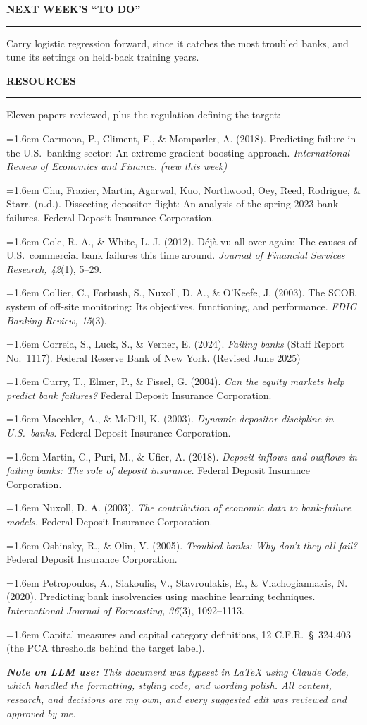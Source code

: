 \documentclass[11pt,letterpaper]{article}
\newcommand{\sectionhead}[1]{%
  \vspace{6pt}%
  {\sffamily\bfseries\fontsize{9.5}{12}\selectfont\color{navy}\MakeUppercase{#1}}\par
  \vspace{-9pt}\textcolor{hairline}{\rule{\textwidth}{0.5pt}}\par\vspace{0pt}}
\newcommand{\answer}[1]{#1\par\vspace{3pt}}
\begin{document}
\sectionhead{Next week's ``To Do''}
\answer{Carry logistic regression forward, since it catches the most troubled banks, and tune its settings on held-back training years.}

\sectionhead{Resources}
\answer{Eleven papers reviewed, plus the regulation defining the target:
{\fontsize{9}{11.5}\selectfont\setlength{\parskip}{3pt}\par\vspace{4pt}
\newcommand{\refentry}[1]{\hangindent=1.6em\hangafter=1 #1\par}
\refentry{Carmona, P., Climent, F., \& Momparler, A. (2018). Predicting failure in the U.S.\ banking sector: An extreme gradient boosting approach. \textit{International Review of Economics and Finance}. \textit{(new this week)}}
\refentry{Chu, Frazier, Martin, Agarwal, Kuo, Northwood, Oey, Reed, Rodrigue, \& Starr. (n.d.). Dissecting depositor flight: An analysis of the spring 2023 bank failures. Federal Deposit Insurance Corporation.}
\refentry{Cole, R. A., \& White, L. J. (2012). D\'{e}j\`{a} vu all over again: The causes of U.S.\ commercial bank failures this time around. \textit{Journal of Financial Services Research, 42}(1), 5--29.}
\refentry{Collier, C., Forbush, S., Nuxoll, D. A., \& O'Keefe, J. (2003). The SCOR system of off-site monitoring: Its objectives, functioning, and performance. \textit{FDIC Banking Review, 15}(3).}
\refentry{Correia, S., Luck, S., \& Verner, E. (2024). \textit{Failing banks} (Staff Report No.\ 1117). Federal Reserve Bank of New York. (Revised June 2025)}
\refentry{Curry, T., Elmer, P., \& Fissel, G. (2004). \textit{Can the equity markets help predict bank failures?} Federal Deposit Insurance Corporation.}
\refentry{Maechler, A., \& McDill, K. (2003). \textit{Dynamic depositor discipline in U.S.\ banks.} Federal Deposit Insurance Corporation.}
\refentry{Martin, C., Puri, M., \& Ufier, A. (2018). \textit{Deposit inflows and outflows in failing banks: The role of deposit insurance.} Federal Deposit Insurance Corporation.}
\refentry{Nuxoll, D. A. (2003). \textit{The contribution of economic data to bank-failure models.} Federal Deposit Insurance Corporation.}
\refentry{Oshinsky, R., \& Olin, V. (2005). \textit{Troubled banks: Why don't they all fail?} Federal Deposit Insurance Corporation.}
\refentry{Petropoulos, A., Siakoulis, V., Stavroulakis, E., \& Vlachogiannakis, N. (2020). Predicting bank insolvencies using machine learning techniques. \textit{International Journal of Forecasting, 36}(3), 1092--1113.}
\refentry{Capital measures and capital category definitions, 12 C.F.R.\ \S\ 324.403 (the PCA thresholds behind the target label).}
}}

\vspace{2pt}
{\small\itshape\color{midgray}\textbf{Note on LLM use:} This document was typeset in LaTeX using Claude Code, which handled the formatting, styling code, and wording polish. All content, research, and decisions are my own, and every suggested edit was reviewed and approved by me.}
\end{document}
